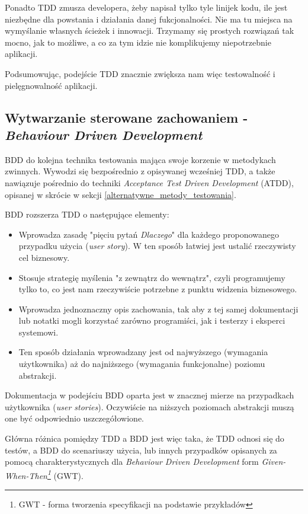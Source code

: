 Ponadto TDD zmusza developera, żeby napisał tylko tyle linijek kodu, ile jest niezbędne dla powstania i działania danej fukcjonalności. Nie ma tu miejsca na wymyślanie własnych ścieżek i innowacji. Trzymamy się prostych rozwiązań tak mocno, jak to możliwe, a co za tym idzie nie komplikujemy niepotrzebnie aplikacji.

Podsumowując, podejście TDD znacznie zwiększa nam więc testowalność i pielęgnowalność aplikacji. 

\subsection{Wytwarzanie sterowane zachowaniem - \textit{Behaviour Driven Development}}
\label{behaviour_driven_development}
BDD do kolejna technika testowania mająca swoje korzenie w metodykach zwinnych. Wywodzi się bezpośrednio z opisywanej wcześniej TDD, a także  nawiązuje pośrednio do techniki \textit{Acceptance Test Driven Development} (ATDD), opisanej w skrócie w sekcji \ref{alternatywne_metody_testowania}.

BDD rozszerza TDD o następujące elementy:
\begin{itemize}
\item
Wprowadza zasadę "pięciu pytań \textit{Dlaczego}" dla każdego proponowanego przypadku użycia (\textit{user story}). W ten sposób łatwiej jest ustalić rzeczywisty cel biznesowy.

\item
Stosuje strategię myślenia "z zewnątrz do wewnątrz", czyli programujemy tylko to, co jest nam rzeczywiście potrzebne z punktu widzenia biznesowego.

\item
Wprowadza jednoznaczny opis zachowania, tak aby z tej samej dokumentacji lub notatki mogli korzystać zarówno programiści, jak i testerzy i eksperci systemowi.

\item
Ten sposób działania wprowadzany jest od najwyższego (wymagania użytkownika) aż do najniższego (wymagania funkcjonalne) poziomu abstrakcji.

\end{itemize}

Dokumentacja w podejściu BDD oparta jest w znacznej mierze na przypadkach użytkownika (\textit{user stories}). Oczywiście na niższych poziomach abstrakcji muszą one być odpowiednio uszczegółowione.

Główna różnica pomiędzy TDD a BDD jest więc taka, że TDD odnosi się do testów, a BDD do scenariuszy użycia, lub innych przypadków opisanych za pomocą charakterystycznych dla \textit{Behaviour Driven Development} form \textit{Given-When-Then\footnote{GWT - forma tworzenia specyfikacji na podstawie przykładów}} (GWT).

